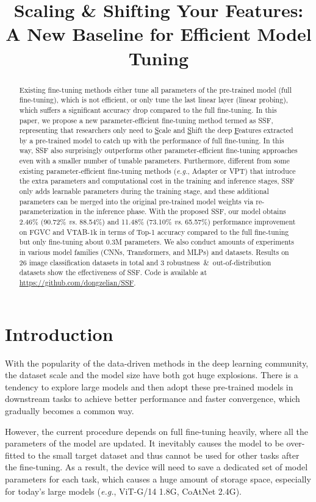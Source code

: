 \title{Scaling & Shifting Your Features: A New Baseline for Efficient Model Tuning}

\begin{abstract}
Existing fine-tuning methods either tune all parameters of the pre-trained model (full fine-tuning), which is not efficient, or only tune the last linear layer (linear probing), which suffers a significant accuracy drop compared to the full fine-tuning. In this paper, we propose a new parameter-efficient fine-tuning method termed as SSF, representing that researchers only need to \underline{S}cale and \underline{S}hift the deep \underline{F}eatures extracted by a pre-trained model to catch up with the performance of full fine-tuning. In this way, SSF also surprisingly outperforms other parameter-efficient fine-tuning approaches even with a smaller number of tunable parameters. Furthermore, different from some existing parameter-efficient fine-tuning methods (\emph{e.g.}, Adapter or VPT) that introduce the extra parameters and computational cost in the training and inference stages, SSF only adds learnable parameters during the training stage, and these additional parameters can be merged into the original pre-trained model weights via re-parameterization in the inference phase. With the proposed SSF, our model obtains 2.46\% (90.72\% \emph{vs.} 88.54\%) and 11.48\% (73.10\% \emph{vs}. 65.57\%) performance improvement on FGVC and VTAB-1k in terms of Top-1 accuracy compared to the full fine-tuning but only fine-tuning about 0.3M parameters. We also conduct amounts of experiments in various model families (CNNs, Transformers, and MLPs) and datasets. Results on 26 image classification datasets in total and 3 robustness~\&~out-of-distribution datasets show the effectiveness of SSF. Code is available at \url{https://github.com/dongzelian/SSF}.
\end{abstract}

\section{Introduction}\label{sec: 1}

With the popularity of the data-driven methods in the deep learning community, the dataset scale and the model size have both got huge explosions. There is a tendency to explore large models and then adopt these pre-trained models in downstream tasks to achieve better performance and faster convergence, which gradually becomes a common way. 

However, the current procedure depends on full fine-tuning heavily, where all the parameters of the model are updated. It inevitably causes the model to be over-fitted to the small target dataset and thus cannot be used for other tasks after the fine-tuning. As a result, the device will need to save a dedicated set of model parameters for each task, which causes a huge amount of storage space, especially for today's large models (\emph{e.g.}, ViT-G/14 \cite{dosovitskiy2020image} 1.8G, CoAtNet \cite{dai2021coatnet} 2.4G). 

